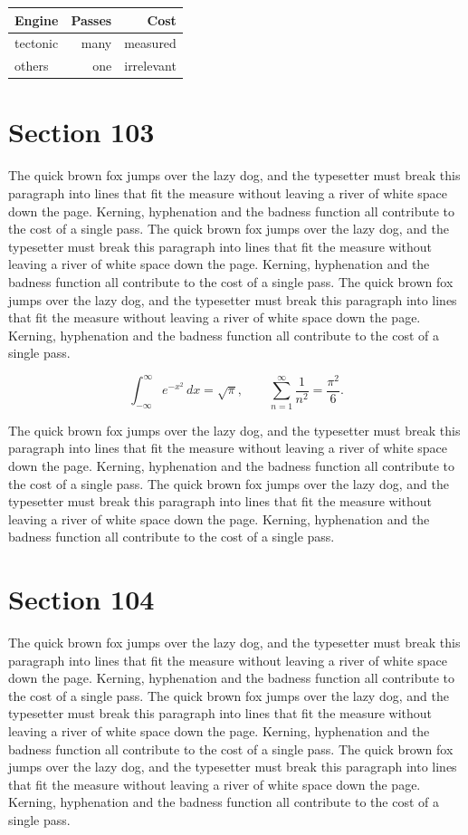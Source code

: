 \documentclass{article}
\begin{document}
\begin{center}
\begin{tabular}{lrr}
\toprule
Engine & Passes & Cost \\
\midrule
tectonic & many & measured \\
others & one & irrelevant \\
\bottomrule
\end{tabular}
\end{center}

\section{Section 103}
The quick brown fox jumps over the lazy dog, and the typesetter must break this paragraph into lines that fit the measure without leaving a river of white space down the page. Kerning, hyphenation and the badness function all contribute to the cost of a single pass. The quick brown fox jumps over the lazy dog, and the typesetter must break this paragraph into lines that fit the measure without leaving a river of white space down the page. Kerning, hyphenation and the badness function all contribute to the cost of a single pass. The quick brown fox jumps over the lazy dog, and the typesetter must break this paragraph into lines that fit the measure without leaving a river of white space down the page. Kerning, hyphenation and the badness function all contribute to the cost of a single pass. 

\begin{equation}
\int_{-\infty}^{\infty} e^{-x^{2}}\,dx = \sqrt{\pi}, \qquad
\sum_{n=1}^{\infty} \frac{1}{n^{2}} = \frac{\pi^{2}}{6}.
\end{equation}

The quick brown fox jumps over the lazy dog, and the typesetter must break this paragraph into lines that fit the measure without leaving a river of white space down the page. Kerning, hyphenation and the badness function all contribute to the cost of a single pass. The quick brown fox jumps over the lazy dog, and the typesetter must break this paragraph into lines that fit the measure without leaving a river of white space down the page. Kerning, hyphenation and the badness function all contribute to the cost of a single pass. 
\section{Section 104}
The quick brown fox jumps over the lazy dog, and the typesetter must break this paragraph into lines that fit the measure without leaving a river of white space down the page. Kerning, hyphenation and the badness function all contribute to the cost of a single pass. The quick brown fox jumps over the lazy dog, and the typesetter must break this paragraph into lines that fit the measure without leaving a river of white space down the page. Kerning, hyphenation and the badness function all contribute to the cost of a single pass. The quick brown fox jumps over the lazy dog, and the typesetter must break this paragraph into lines that fit the measure without leaving a river of white space down the page. Kerning, hyphenation and the badness function all contribute to the cost of a single pass. 
\end{document}
